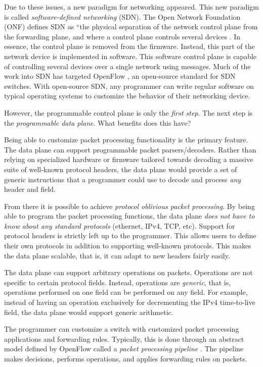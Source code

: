 Due to these issues, a new paradigm for networking appeared. This new paradigm is called \textit{software-defined networking} (SDN). The Open Network Foundation (ONF) defines SDN as ``the physical separation of the network control plane from the forwarding plane, and where a control plane controls several devices \cite{onf_sdn_def}. In essence, the control plane is removed from the firmware. Instead, this part of the network device is implemented in software. This software control plane is capable of controlling several devices over a single network using messages. Much of the work into SDN has targeted OpenFlow \cite{openflow_spec}, an open-source standard for SDN switches. With open-source SDN, any programmer can write regular software on typical operating systems to customize the behavior of their networking device. 

However, the programmable control plane is only the \emph{first step}. The next step is the \emph{programmable data plane}. What benefits does this have?

Being able to customize packet processing functionality is the primary feature.
The data plane can support programmable packet parsers/decoders. Rather than relying on specialized hardware or firmware tailored towards decoding a massive suite of well-known protocol headers, the data plane would provide a set of generic instructions that a programmer could use to decode and process \emph{any} header and field.

From there it is possible to achieve \textit{protocol oblivious packet processing}. By being able to program the packet processing functions, the data plane \textit{does not have to know about any standard protocols} (ethernet, IPv4, TCP, etc). Support for protocol headers is strictly left up to the programmer. This allows users to define their own protocols in addition to supporting well-known protocols. This makes the data plane scalable, that is, it can adapt to new headers fairly easily.

The data plane can support arbitrary operations on packets. Operations are not specific to certain protocol fields. Instead, operations are \textit{generic}, that is, operations performed on one field can be performed on any field. For example, instead of having an operation exclusively for decrementing the IPv4 time-to-live field, the data plane would support generic arithmetic.

The programmer can customize a switch with customized packet processing applications and forwarding rules. Typically, this is done through an abstract model defined by OpenFlow called a \textit{packet processing pipeline} \cite{openflow_spec}. The pipeline makes decisions, performs operations, and applies forwarding rules on packets.

